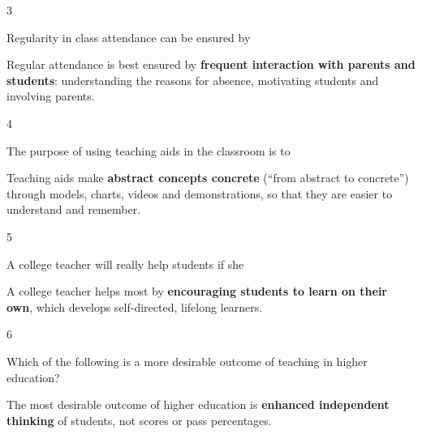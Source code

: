 \begin{question}{3}
{Regularity in class attendance can be ensured by\par}
\begin{explain}
Regular attendance is best ensured by \textbf{frequent interaction with parents and students}: understanding the reasons for absence, motivating students and involving parents.
\end{explain}
\end{question}

\begin{question}{4}
{The purpose of using teaching aids in the classroom is to\par}
\begin{explain}
Teaching aids make \textbf{abstract concepts concrete} (``from abstract to concrete'') through models, charts, videos and demonstrations, so that they are easier to understand and remember.
\end{explain}
\end{question}

\begin{question}{5}
{A college teacher will really help students if she\par}
\begin{explain}
A college teacher helps most by \textbf{encouraging students to learn on their own}, which develops self-directed, lifelong learners.
\end{explain}
\end{question}

\begin{question}{6}
{Which of the following is a more desirable outcome of teaching in higher education?\par}
\begin{explain}
The most desirable outcome of higher education is \textbf{enhanced independent thinking} of students, not scores or pass percentages.
\end{explain}
\end{question}

